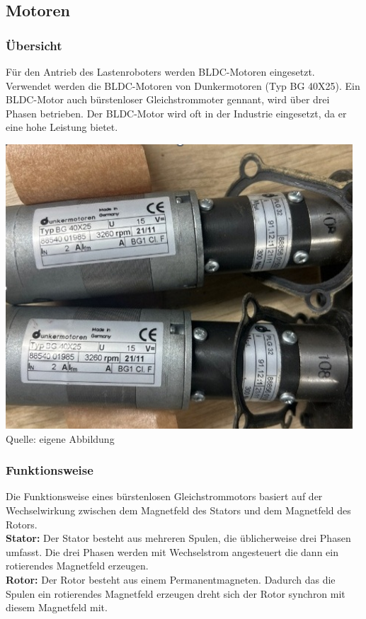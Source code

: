 \documentclass[ngerman,12pt,a4paper]{article}
\begin{document}
		\subsection{Motoren} %
		
			\subsubsection{Übersicht}
			Für den Antrieb des Lastenroboters werden BLDC-Motoren eingesetzt. Verwendet werden die BLDC-Motoren von Dunkermotoren (Typ BG 40X25). Ein BLDC-Motor auch bürstenloser Gleichstrommoter gennant, wird über drei Phasen betrieben. Der BLDC-Motor wird oft in der Industrie eingesetzt, da er eine hohe Leistung bietet.
			
			\begin{center}
				\begin{minipage}{\textwidth}
					\centering
					\includegraphics[scale=0.5]{Pictures/Motoren}
					\label{fig:spiffs_init}
					\vspace{-2pt}
					{\small Quelle: eigene Abbildung}
				\end{minipage}
			\end{center}
			
			\subsubsection{Funktionsweise}
			Die Funktionsweise eines bürstenlosen Gleichstrommotors basiert auf der Wechselwirkung zwischen dem Magnetfeld des Stators und dem Magnetfeld des Rotors.\\[0.5cm]
			\textbf{Stator:} Der Stator besteht aus mehreren Spulen, die üblicherweise drei Phasen umfasst. Die drei Phasen werden mit Wechselstrom angesteuert die dann ein rotierendes Magnetfeld erzeugen.\\[0.5cm]
			\textbf{Rotor:} Der Rotor besteht aus einem Permanentmagneten. Dadurch das die Spulen ein rotierendes Magnetfeld erzeugen dreht sich der Rotor synchron mit diesem Magnetfeld mit.
			
\end{document}
